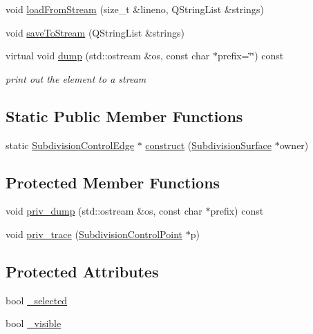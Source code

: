 \begin{DoxyCompactItemize}
\item 
void \hyperlink{classShipCAD_1_1SubdivisionControlEdge_a318bf4102460ba91fd9e79fbde265ee3}{load\-From\-Stream} (size\-\_\-t \&lineno, Q\-String\-List \&strings)
\item 
void \hyperlink{classShipCAD_1_1SubdivisionControlEdge_a9228cf5bb5b09daf26eb4022f09337f0}{save\-To\-Stream} (Q\-String\-List \&strings)
\item 
virtual void \hyperlink{classShipCAD_1_1SubdivisionControlEdge_abdfa96ff05eff404214a92d38d7eb715}{dump} (std\-::ostream \&os, const char $\ast$prefix=\char`\"{}\char`\"{}) const 
\begin{DoxyCompactList}\small\item\em print out the element to a stream \end{DoxyCompactList}\end{DoxyCompactItemize}
\subsection*{Static Public Member Functions}
\begin{DoxyCompactItemize}
\item 
static \hyperlink{classShipCAD_1_1SubdivisionControlEdge}{Subdivision\-Control\-Edge} $\ast$ \hyperlink{classShipCAD_1_1SubdivisionControlEdge_a20fc507b201766b6e3d0560595946fac}{construct} (\hyperlink{classShipCAD_1_1SubdivisionSurface}{Subdivision\-Surface} $\ast$owner)
\end{DoxyCompactItemize}
\subsection*{Protected Member Functions}
\begin{DoxyCompactItemize}
\item 
void \hyperlink{classShipCAD_1_1SubdivisionControlEdge_acc4cee57db50beb1dcc6361f7f2c62af}{priv\-\_\-dump} (std\-::ostream \&os, const char $\ast$prefix) const 
\item 
void \hyperlink{classShipCAD_1_1SubdivisionControlEdge_aec6ff8caa6996ae5a9d2e58d5d2b0344}{priv\-\_\-trace} (\hyperlink{classShipCAD_1_1SubdivisionControlPoint}{Subdivision\-Control\-Point} $\ast$p)
\end{DoxyCompactItemize}
\subsection*{Protected Attributes}
\begin{DoxyCompactItemize}
\item 
bool \hyperlink{classShipCAD_1_1SubdivisionControlEdge_a8e67d30ef7ef87ff599f73b59c806f58}{\-\_\-selected}
\item 
bool \hyperlink{classShipCAD_1_1SubdivisionControlEdge_a8d49343e2b6ff0ab13653849af242740}{\-\_\-visible}
\end{DoxyCompactItemize}


